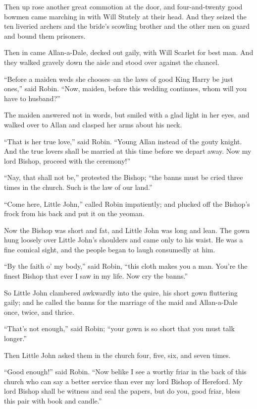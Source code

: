 Then up rose another great commotion at the door, and four-and-twenty
good bowmen came marching in with Will Stutely at their head. And they
seized the ten liveried archers and the bride's scowling brother and the
other men on guard and bound them prisoners.

Then in came Allan-a-Dale, decked out gaily, with Will Scarlet for best
man. And they walked gravely down the aisle and stood over against the
chancel.

``Before a maiden weds she chooses--an the laws of good King Harry be
just ones,'' said Robin. ``Now, maiden, before this wedding continues,
whom will you have to husband?''

The maiden answered not in words, but smiled with a glad light in her
eyes, and walked over to Allan and clasped her arms about his neck.

``That is her true love,'' said Robin. ``Young Allan instead of the
gouty knight. And the true lovers shall be married at this time before
we depart away. Now my lord Bishop, proceed with the ceremony!''

``Nay, that shall not be,'' protested the Bishop; ``the banns must be
cried three times in the church. Such is the law of our land.''

``Come here, Little John,'' called Robin impatiently; and plucked off
the Bishop's frock from his back and put it on the yeoman.

Now the Bishop was short and fat, and Little John was long and lean. The
gown hung loosely over Little John's shoulders and came only to his
waist. He was a fine comical sight, and the people began to laugh
consumedly at him.

``By the faith o' my body,'' said Robin, ``this cloth makes you a man.
You're the finest Bishop that ever I saw in my life. Now cry the
banns.''

So Little John clambered awkwardly into the quire, his short gown
fluttering gaily; and he called the banns for the marriage of the maid
and Allan-a-Dale once, twice, and thrice.

``That's not enough,'' said Robin; ``your gown is so short that you must
talk longer.''

Then Little John asked them in the church four, five, six, and seven
times.

``Good enough!'' said Robin. ``Now belike I see a worthy friar in the
back of this church who can say a better service than ever my lord
Bishop of Hereford. My lord Bishop shall be witness and seal the papers,
but do you, good friar, bless this pair with book and candle.''

